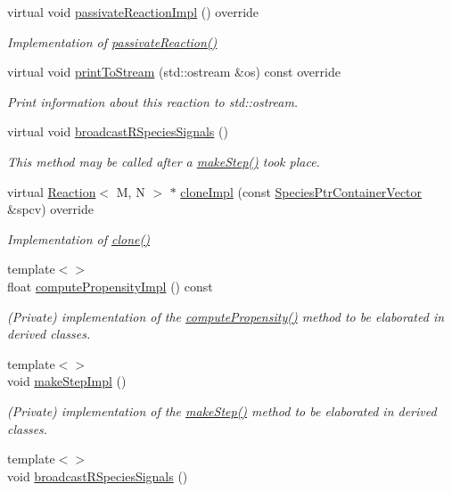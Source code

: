 \begin{DoxyCompactItemize}
virtual void \hyperlink{classchem_1_1Reaction_a691c21e0428d9e5894a6903b5997936f}{passivate\-Reaction\-Impl} () override
\begin{DoxyCompactList}\small\item\em Implementation of \hyperlink{classchem_1_1ReactionBase_a9fe4cf91fcff8c4aea65e759841c28fe}{passivate\-Reaction()} \end{DoxyCompactList}\item 
virtual void \hyperlink{classchem_1_1Reaction_aab3ab648fdbcf495df822a4fbdbcae21}{print\-To\-Stream} (std\-::ostream \&os) const override
\begin{DoxyCompactList}\small\item\em Print information about this reaction to std\-::ostream. \end{DoxyCompactList}\item 
virtual void \hyperlink{classchem_1_1Reaction_a8320a7d024a3dc0e64280ed96ea08730}{broadcast\-R\-Species\-Signals} ()
\begin{DoxyCompactList}\small\item\em This method may be called after a \hyperlink{classchem_1_1ReactionBase_acb5575b08ca39fc6dd7a571fb246806b}{make\-Step()} took place. \end{DoxyCompactList}\item 
virtual \hyperlink{classchem_1_1Reaction}{Reaction}$<$ M, N $>$ $\ast$ \hyperlink{classchem_1_1Reaction_a26efcc4b38c615c7d63f3fb1cfae070e}{clone\-Impl} (const \hyperlink{classchem_1_1SpeciesPtrContainerVector}{Species\-Ptr\-Container\-Vector} \&spcv) override
\begin{DoxyCompactList}\small\item\em Implementation of \hyperlink{classchem_1_1ReactionBase_a6d8e6fe06e073991fe263393ec418867}{clone()} \end{DoxyCompactList}\item 
{\footnotesize template$<$$>$ }\\float \hyperlink{classchem_1_1Reaction_ad0245708cd816ceccf686eebaf06353b}{compute\-Propensity\-Impl} () const
\begin{DoxyCompactList}\small\item\em (Private) implementation of the \hyperlink{classchem_1_1ReactionBase_a3e91b5d0c44fcb81bb17d2d0fee7947d}{compute\-Propensity()} method to be elaborated in derived classes. \end{DoxyCompactList}\item 
{\footnotesize template$<$$>$ }\\void \hyperlink{classchem_1_1Reaction_ac1ac05b087d53ff5bcc9e5e00e83bb1d}{make\-Step\-Impl} ()
\begin{DoxyCompactList}\small\item\em (Private) implementation of the \hyperlink{classchem_1_1ReactionBase_acb5575b08ca39fc6dd7a571fb246806b}{make\-Step()} method to be elaborated in derived classes. \end{DoxyCompactList}\item 
{\footnotesize template$<$$>$ }\\void \hyperlink{classchem_1_1Reaction_afd605803666c03f48ec6db0f2c837fa9}{broadcast\-R\-Species\-Signals} ()
\end{DoxyCompactItemize}
